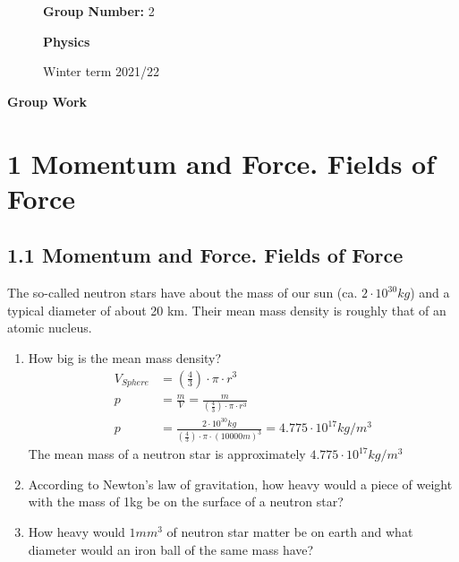 \documentclass[10pt,ngerman]{scrartcl}
\begin{document}
\begin{figure}[htbp]
\begin{minipage}[b]{0.50\linewidth}
\begin{Large}
	\textbf{Group Number:} 2\newline\newline
\end{Large}
\end{minipage}
\begin{minipage}[b]{0.50\linewidth}
\begin{flushright}
\begin{Huge}
\textbf{Physics}\\
\end{Huge}
\vspace{0.5cm}
\begin{large}
Winter term 2021/22
\end{large}
\end{flushright}
\end{minipage}
\end{figure}

\vspace{2cm}
\begin{huge}
\noindent

\textbf{Group Work}
\end{huge}

\section{1 Momentum and Force. Fields of Force}
\subsection{1.1 Momentum and Force. Fields of Force}
The so-called neutron stars have about the mass of our sun (ca. $2 \cdot 10^{30}kg$) and a typical diameter of about 20 km. Their mean mass density is roughly that of an atomic nucleus.
\begin{enumerate}
	\item How big is the mean mass density?
	\begin{align*}
		V_{Sphere} &= (\frac{4}{3}) \cdot \pi \cdot r^3\\
		p &= \frac{m}{V} = \frac{m}{(\frac{4}{3}) \cdot \pi \cdot r^3}\\
		p &= \frac{2 \cdot 10^{30}kg}{(\frac{4}{3}) \cdot \pi \cdot (10000m)^3} = 4.775 \cdot 10^{17} kg/m^3
	\end{align*}
	The mean mass of a neutron star is approximately $4.775 \cdot 10^{17} kg/m^3$\newline
	\item According to Newton's law of gravitation, how heavy would a piece of weight with the mass of 1kg be on the surface of a neutron star?
	\item How heavy would $1mm^3$ of neutron star matter be on earth and what diameter would an iron ball of the same mass have?
\end{enumerate}
\end{document}
